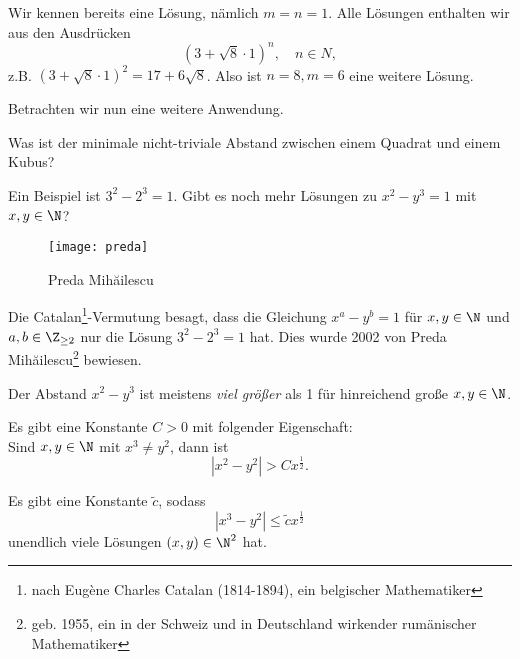 Wir kennen bereits eine Lösung, nämlich $m=n=1$. Alle Lösungen enthalten wir aus den Ausdrücken
\[ \left( 3+\sqrt{8} \cdot 1 \right)^n,\quad n \in N, \]
z.B. \( (3+\sqrt{8} \cdot 1)^2 = 17+6\sqrt{8} \). Also ist $n=8,m=6$ eine weitere Lösung.

Betrachten wir nun eine weitere Anwendung.
\begin{frage*}
	Was ist der minimale nicht-triviale Abstand zwischen einem Quadrat und einem Kubus?
\end{frage*}

Ein Beispiel ist $3^2-2^3 = 1$. Gibt es noch mehr Lösungen zu $x^2-y^3=1$ mit $x,y \in \N$?


\begin{wrapfigure}{r}{7cm}
	\begin{center}
		\texttt{[image: preda]}
		\caption{Preda Mih\u{a}ilescu}
	\end{center}
\end{wrapfigure}
Die Catalan\footnote{nach Eugène Charles Catalan (1814-1894), ein belgischer Mathematiker}-Vermutung besagt, dass die Gleichung $x^a-y^b=1$ für $x,y \in \N$ und $a,b \in \Z_{\geq 2}$ nur die Lösung $3^2-2^3=1$ hat. Dies wurde 2002 von Preda Mih\u{a}ilescu\footnote{geb. 1955, ein in der Schweiz und in Deutschland wirkender rumänischer Mathematiker} bewiesen.

\begin{obs*}
	Der Abstand $x^2-y^3$ ist meistens \emph{viel größer} als 1 für hinreichend große $x,y \in \N$.
\end{obs*}

\begin{conj*}[Hall, 1969]
	Es gibt eine Konstante $C>0$ mit folgender Eigenschaft:\\
	Sind $x,y \in \N$ mit $x^3 \neq y^2$, dann ist
	\[ |x^2-y^2| > C x^\frac{1}{2}. \]
\end{conj*}

\begin{prop*}
	Es gibt eine Konstante $\tilde{c}$, sodass
	\[ |x^3-y^2| \leq \tilde{c} x^\frac{1}{2} \]
	unendlich viele Lösungen $(x,y) \in \N^2$ hat.
\end{prop*}

